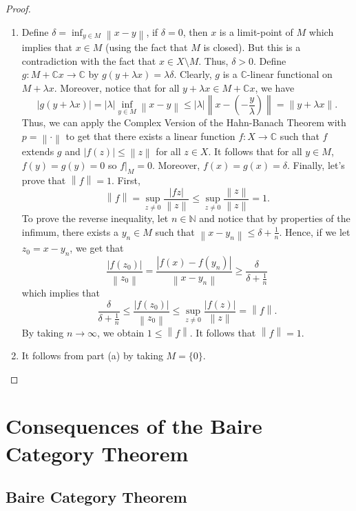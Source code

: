 \documentclass{article}
\newcommand{\C}{\mathbb{C}}
\newcommand{\N}{\mathbb{N}}
\newcommand{\norm}[1]{\left\lVert#1 \right\rVert}
\newcommand{\abs}[1]{\left\lvert#1 \right\rvert}
\begin{document}
\begin{proof}
    \begin{enumerate}[label=(\alph*)]
        \item Define $\delta = \inf_{y\in M}\norm{x - y}$, if $\delta = 0$, then $x$ is a limit-point of $M$ which implies that $x \in M$ (using the fact that $M$ is closed). But this is a contradiction with the fact that $x \in X\setminus M$. Thus, $\delta > 0$. Define $g : M + \C x \to \C$ by $g(y+\lambda x) = \lambda \delta$. Clearly, $g$ is a $\C$-linear functional on $M + \lambda x$. Moreover, notice that for all $y + \lambda x \in M + \C x$, we have
        $$|g(y + \lambda x)| = |\lambda|\inf_{y\in M}\norm{x - y} \leq |\lambda| \norm{x - \left(-\frac{y}{\lambda}\right)} = \norm{y + \lambda x}.$$
        Thus, we can apply the Complex Version of the Hahn-Banach Theorem with $p = \norm{\cdot}$ to get that there exists a linear function $f : X \to \C$ such that $f$ extends $g$ and $|f(z)| \leq \norm{z}$ for all $z \in X$. It follows that for all $y \in M$, $f(y) = g(y) = 0$ so $f|_M = 0$. Moreover, $f(x) = g(x) = \delta$. Finally, let's prove that $\norm{f} = 1$. First,
        $$\norm{f} = \sup_{z \neq 0}\frac{\abs{fz}}{\norm{z}} \leq \sup_{z \neq 0}\frac{\norm{z}}{\norm{z}} = 1.$$
        To prove the reverse inequality, let $n \in \N$ and notice that by properties of the infimum, there exists a $y_n \in M$ such that $\norm{x - y_n} \leq \delta + \frac{1}{n}$. Hence, if we let $z_0 = x - y_n$, we get that
        $$\frac{|f(z_0)|}{\norm{z_0}} = \frac{|f(x) - f(y_n)|}{\norm{x - y_n}} \geq \frac{\delta}{\delta + \frac{1}{n}}$$
        which implies that
        $$\frac{\delta}{\delta + \frac{1}{n}} \leq \frac{|f(z_0)|}{\norm{z_0}} \leq \sup_{z \neq 0}\frac{|f(z)|}{\norm{z}} = \norm{f}.$$
        By taking $n \rightarrow \infty$, we obtain $1 \leq \norm{f}$. It follows that $\norm{f} = 1$.
        \item It follows from part (a) by taking $M = \{0\}$.
    \end{enumerate}
\end{proof}

\section{Consequences of the Baire Category Theorem}

\subsection{Baire Category Theorem}
\end{document}
